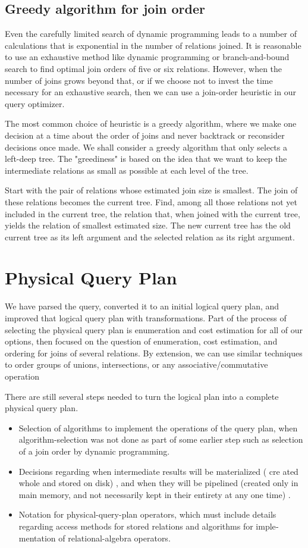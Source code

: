\subsection{Greedy algorithm for join order}
Even the carefully limited search of dynamic pro­gramming leads to a number of calculations that is exponential in the number
of relations joined. It is reasonable to use an exhaustive method like dynamic programming or branch-and-bound search to find optimal join orders of five or six relations. However, when the number of joins grows beyond that, or if we choose not to invest the time necessary for an exhaustive search, then we can use a join-order heuristic in our query optimizer.
\par The most common choice of heuristic is a greedy algorithm, where we make one decision at a time about the order of joins and never backtrack or reconsider decisions once made. We shall consider a greedy algorithm that only selects a left-deep tree. The "greediness" is based on the idea that we want to keep the intermediate relations as small as possible at each level of the tree.
\par Start with the pair of relations whose estimated join size is smallest. The join of these relations becomes the current tree. Find, among all those relations not yet included in the current tree, the relation that, when joined with the current tree, yields the relation of smallest estimated size. The new current tree has the old current tree as its left argument and the selected relation as its right argument.


\section{Physical Query Plan}
We have parsed the query, converted it to an initial logical query plan, and improved that logical query plan with transformations. Part of the process of selecting the physical query plan is enumeration and cost­ estimation for all of our options, then focused on the question of enumeration, cost estimation, and ordering for joins of several relations. By extension, we can use similar techniques to order groups of unions, intersections, or any associative/commutative operation
\par There are still several steps needed to turn the logical plan into a complete
physical query plan.
\begin{itemize}
    \item Selection of algorithms to implement the operations of the query plan,
when algorithm-selection was not done as part of some earlier step such
as selection of a join order by dynamic programming.
    \item Decisions regarding when intermediate results will be materialized ( cre­
ated whole and stored on disk) , and when they will be pipelined (created
only in main memory, and not necessarily kept in their entirety at any
one time) .
    \item Notation for physical-query-plan operators, which must include details
regarding access methods for stored relations and algorithms for imple­
mentation of relational-algebra operators.
\end{itemize}

